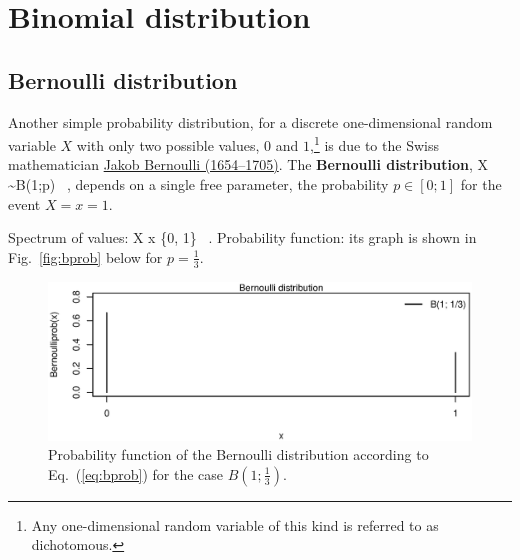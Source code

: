 \section[Binomial distribution]{Binomial distribution}
\subsection[Bernoulli distribution]{Bernoulli distribution}
Another simple probability distribution, for a discrete 
one-dimensional random variable $X$ with only two possible values, 
$0$ and $1$,\footnote{Any one-dimensional random variable of this 
kind is referred to as dichotomous.} is due to the Swiss 
mathematician 
\href{http://www-history.mcs.st-and.ac.uk/Biographies/Bernoulli_Jacob.html}{Jakob Bernoulli (1654--1705)}. The \textbf{Bernoulli 
distribution},
%
\be
X \sim B(1;p) \ ,
\ee
%
depends on a single free parameter, the probability $p \in [0;1]$
for the event $X = x = 1$.

\medskip
\noindent
Spectrum of values:
%
\be
X \mapsto x \in \left\{0, 1\right\} \ .
\ee
%
Probability function:
%
\be
{}
\ee
%
its graph is shown in Fig.~\ref{fig:bprob} below for 
$\displaystyle p=\frac{1}{3}$.
%
\begin{figure}[!htb]
\begin{center}
\includegraphics[scale=0.8]{bprob.eps}
\end{center}
\caption{Probability function of the Bernoulli distribution 
according to Eq.~(\ref{eq:bprob}) for the case $\displaystyle 
B\left(1;\frac{1}{3}\right)$.}
\end{figure}
%

